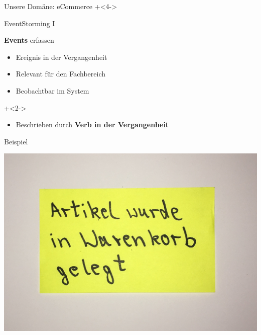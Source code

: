 \begin{frame}[fragile]{Unsere Domäne: eCommerce}
\onslide+<4->

\end{frame}


\begin{frame}[fragile]{EventStorming I}

\textbf{Events} erfassen

\begin{itemize}
\item Ereignis in der Vergangenheit
\item Relevant für den Fachbereich
\item Beobachtbar im System
\end{itemize}

\onslide+<2->
\begin{itemize}
\item Beschrieben durch \textbf{Verb in der Vergangenheit}
\end{itemize}

\end{frame}

\begin{frame}[fragile]{Beispiel}

\begin{center}
\includegraphics[width=.5\textwidth]{pics/eventstorming1.jpg}
\end{center}

\end{frame}


